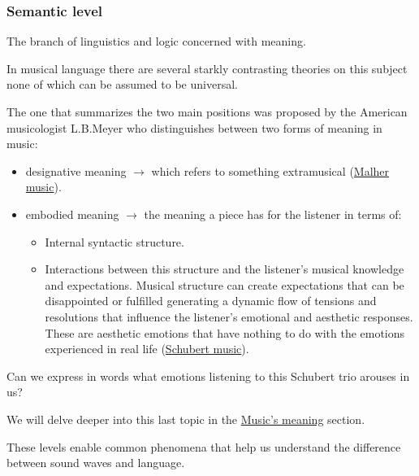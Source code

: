 \subsubsection{Semantic level}\label{semantic-level}

The branch of linguistics and logic concerned with meaning.

In musical language there are several starkly contrasting theories on this subject none of which can be assumed to be universal.

The one that summarizes the two main positions was proposed by the American musicologist L.B.Meyer who distinguishes between two forms of meaning in music:

\begin{itemize}
\tightlist
\item designative meaning \(\rightarrow\) which refers to something extramusical (\href{Malher.mov}{Malher music}).
\item embodied meaning \(\rightarrow\) the meaning a piece has for the listener in terms of:

  \begin{itemize}
  \tightlist
  \item Internal syntactic structure.
  \item Interactions between this structure and the listener's musical knowledge and expectations. Musical structure can create expectations that can be disappointed or fulfilled generating a dynamic flow of tensions and resolutions that influence the listener's emotional and aesthetic responses. These are aesthetic emotions that have nothing to do with the emotions experienced in real life (\href{Schubert.mov}{Schubert music}).
  \end{itemize}
\end{itemize}

Can we express in words what emotions listening to this Schubert trio arouses in us?

We will delve deeper into this last topic in the \hyperref[meaning]{Music’s meaning} section.

These levels enable common phenomena that help us understand the difference between sound waves and language.

